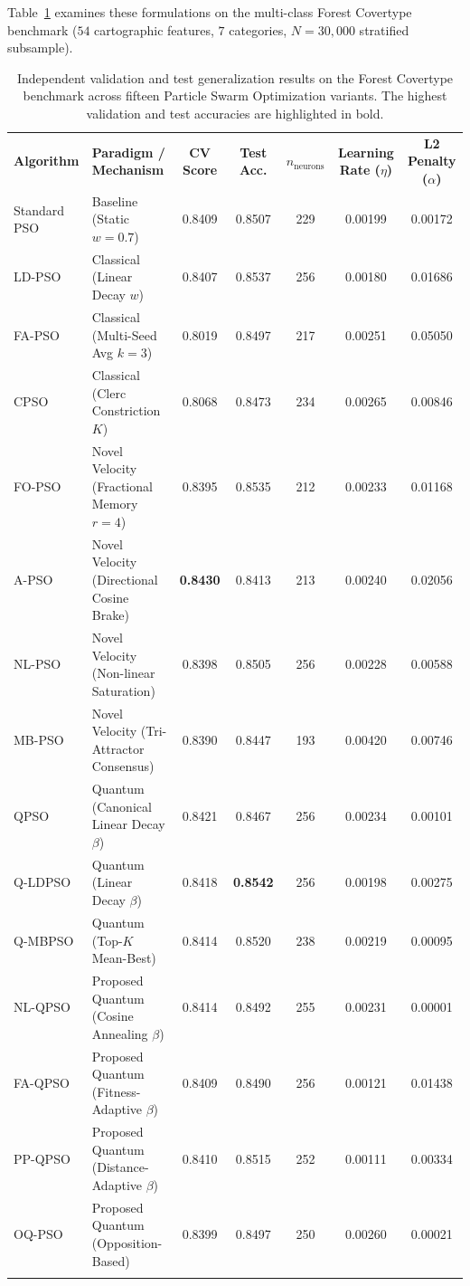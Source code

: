 \documentclass[10pt]{article}
\def\jfdsTopRule{\noalign{\hrule height 0.7pt\vskip 2pt}}
\def\jfdsMidRule{\noalign{\vskip 1.5pt\hrule height 0.4pt\vskip 2pt}}
\def\jfdsBotRule{\noalign{\vskip 1.5pt\hrule height 0.7pt}}
\begin{document}
Table~\ref{tab:covertype_results} examines these formulations on the multi-class Forest Covertype benchmark ($54$ cartographic features, $7$ categories, $N=30{,}000$ stratified subsample).

\begin{table}[htbp]
\centering
\fontsize{7.0pt}{9.6pt}\selectfont
\setlength{\tabcolsep}{4.5pt}
\caption{Independent validation and test generalization results on the Forest Covertype benchmark across fifteen Particle Swarm Optimization variants. The highest validation and test accuracies are highlighted in bold.}
\label{tab:covertype_results}
\vspace{3pt}
\begin{tabular}{llccccc}
\jfdsTopRule
\textbf{Algorithm} & \textbf{Paradigm / Mechanism} & \textbf{CV Score} & \textbf{Test Acc.} & \textbf{$n_{\mathrm{neurons}}$} & \textbf{Learning Rate ($\eta$)} & \textbf{L2 Penalty ($\alpha$)} \\
\jfdsMidRule
Standard PSO & Baseline (Static $w=0.7$) & 0.8409 & 0.8507 & 229 & 0.00199 & 0.00172 \\
LD-PSO & Classical (Linear Decay $w$) & 0.8407 & 0.8537 & 256 & 0.00180 & 0.01686 \\
FA-PSO & Classical (Multi-Seed Avg $k=3$) & 0.8019 & 0.8497 & 217 & 0.00251 & 0.05050 \\
CPSO & Classical (Clerc Constriction $K$) & 0.8068 & 0.8473 & 234 & 0.00265 & 0.00846 \\
\jfdsMidRule
FO-PSO & Novel Velocity (Fractional Memory $r=4$) & 0.8395 & 0.8535 & 212 & 0.00233 & 0.01168 \\
A-PSO & Novel Velocity (Directional Cosine Brake) & \textbf{0.8430} & 0.8413 & 213 & 0.00240 & 0.02056 \\
NL-PSO & Novel Velocity (Non-linear Saturation) & 0.8398 & 0.8505 & 256 & 0.00228 & 0.00588 \\
MB-PSO & Novel Velocity (Tri-Attractor Consensus) & 0.8390 & 0.8447 & 193 & 0.00420 & 0.00746 \\
\jfdsMidRule
QPSO & Quantum (Canonical Linear Decay $\beta$) & 0.8421 & 0.8467 & 256 & 0.00234 & 0.00101 \\
Q-LDPSO & Quantum (Linear Decay $\beta$) & 0.8418 & \textbf{0.8542} & 256 & 0.00198 & 0.00275 \\
Q-MBPSO & Quantum (Top-$K$ Mean-Best) & 0.8414 & 0.8520 & 238 & 0.00219 & 0.00095 \\
\jfdsMidRule
NL-QPSO & Proposed Quantum (Cosine Annealing $\beta$) & 0.8414 & 0.8492 & 255 & 0.00231 & 0.00001 \\
FA-QPSO & Proposed Quantum (Fitness-Adaptive $\beta$) & 0.8409 & 0.8490 & 256 & 0.00121 & 0.01438 \\
PP-QPSO & Proposed Quantum (Distance-Adaptive $\beta$) & 0.8410 & 0.8515 & 252 & 0.00111 & 0.00334 \\
OQ-PSO & Proposed Quantum (Opposition-Based) & 0.8399 & 0.8497 & 250 & 0.00260 & 0.00021 \\
\jfdsBotRule
\end{tabular}
\end{table}
\end{document}
